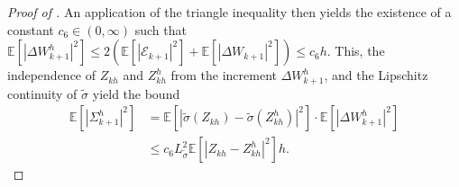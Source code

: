 \documentclass[onseside, final]{amsart}
\theoremstyle{definition}
\numberwithin{equation}{section}
\begin{document}
\begin{proof}[Proof of ]
			An application of the triangle inequality then yields the existence of a constant $c_6 \in (0, \infty)$ such that $\mathbb{E}[|\Delta W^h_{k + 1}|^{2}] \leq 2(\mathbb{E}[|\mathcal E_{k + 1}|^{2}] + \mathbb{E}[|\Delta W_{k + 1}|^{2}])  \leq c_6 h$.
			This, the independence of $Z_{kh}$ and  $Z^h_{kh}$ from the increment $\Delta W^h_{k + 1}$, and the Lipschitz continuity of $\tilde\sigma$ yield the bound
			\begin{equation}\label{eq:conv10}
				\begin{aligned}
					\mathbb{E}[|\Sigma^h_{k + 1}|^2]
					& =
					\mathbb{E}[|\tilde\sigma(Z_{kh})-\tilde\sigma(Z^h_{kh})|^{2}] \cdot \mathbb{E}[|\Delta W^h_{k + 1}|^{2}] 
					\\&\le
					c_6 L_{\tilde \sigma}^{2}  \mathbb{E}[|Z_{kh}-Z^h_{kh}|^{2}]  h.
				\end{aligned}
			\end{equation}
			

\end{proof}
\end{document}
